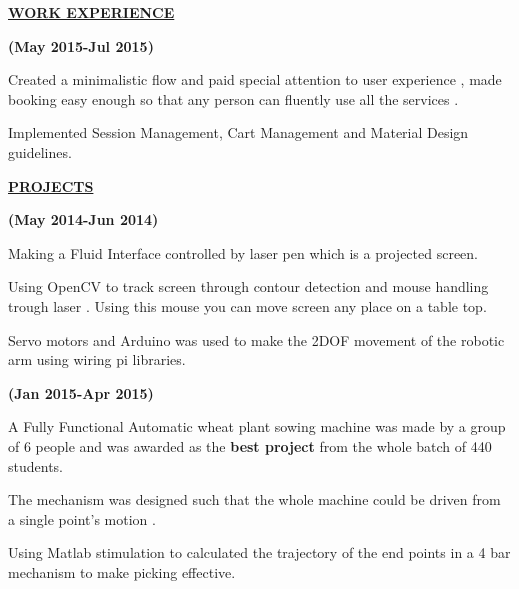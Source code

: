 \documentclass[letterpaper]{deedy-resume} %
\begin{document}
\begin{minipage}[t]{1.00\textwidth}
{\uppercase\uline{\textbf{\large{Work Experience}}\hfill}}
\microspace

\hfill {\textbf{(May 2015-Jul 2015)}}\\

\begin{tightitemize}
\item Created a minimalistic flow and paid special attention to user experience , made booking easy enough so that any person can fluently use all the services .
\item Implemented Session Management, Cart Management and Material Design guidelines.
\end{tightitemize}

\sectionspace %


{\uppercase\uline{\textbf{\large{Projects}}\hfill}}
\microspace

\hfill {\textbf{(May 2014-Jun 2014)}}\\

\begin{tightitemize}
\item Making a Fluid Interface controlled by laser pen which is a projected screen.
\item Using OpenCV to track screen through contour detection and mouse handling trough laser . Using this mouse you can move screen any place on a table top.
\item Servo motors and Arduino was used to make the 2DOF movement of the robotic arm using wiring pi libraries.
\end{tightitemize}

\microspace

\hfill {\textbf{(Jan 2015-Apr 2015)}}\\
\begin{tightitemize}
\item A Fully Functional Automatic wheat plant sowing machine was made by a group of 6 people and was awarded as the \textbf{best project} from the whole batch of 440 students.
\item The mechanism was designed such that the whole machine could be driven from a single point's motion .
\item Using Matlab stimulation to calculated the trajectory of the end points in a 4 bar mechanism to make picking effective.
\end{tightitemize}


\end{minipage}
\end{document}
